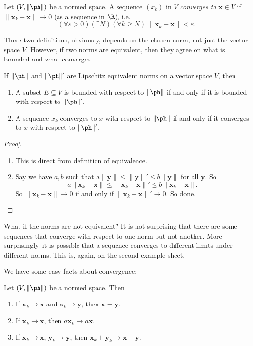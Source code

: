 \documentclass[a4paper]{article}
\begin{document}
\begin{defi}
  Let $(V, \|\ph\|)$ be a normed space. A sequence $(x_k)$ in $V$ \emph{converges to} $\mathbf{x} \in V$ if $\|\mathbf{x}_k - \mathbf{x}\| \to 0$ (as a sequence in $\R$), i.e.
  \[
    (\forall \varepsilon > 0)(\exists N)(\forall k \geq N)\; \|\mathbf{x}_k - \mathbf{x}\| < \varepsilon.
  \]
\end{defi}
These two definitions, obviously, depends on the chosen norm, not just the vector space $V$. However, if two norms are equivalent, then they agree on what is bounded and what converges.
\begin{prop}
  If $\|\ph \|$ and $\|\ph \|'$ are Lipschitz equivalent norms on a vector space $V$, then
  \begin{enumerate}
    \item A subset $E\subseteq V$ is bounded with respect to $\|\ph \|$ if and only if it is bounded with respect to $\|\ph \|'$.
    \item A sequence $x_k$ converges to $x$ with respect to $\|\ph \|$ if and only if it converges to $x$ with respect to $\|\ph \|'$.
  \end{enumerate}
\end{prop}

\begin{proof}\leavevmode
  \begin{enumerate}
    \item This is direct from definition of equivalence.
    \item Say we have $a, b$ such that $a\|\mathbf{y}\| \leq \|\mathbf{y}\|' \leq b\|\mathbf{y}\|$ for all $\mathbf{y}$. So
      \[
        a\|\mathbf{x}_k - \mathbf{x}\| \leq \|\mathbf{x}_k - \mathbf{x}\|' \leq b\|\mathbf{x}_k - \mathbf{x}\|.
      \]
      So $\|\mathbf{x}_k - \mathbf{x}\| \to 0$ if and only if $\|\mathbf{x}_k - \mathbf{x}\|' \to 0$. So done.
  \end{enumerate}
\end{proof}
What if the norms are not equivalent? It is not surprising that there are some sequences that converge with respect to one norm but not another. More surprisingly, it is possible that a sequence converges to different limits under different norms. This is, again, on the second example sheet.

We have some easy facts about convergence:
\begin{prop}
  Let $(V, \|\ph \|)$ be a normed space. Then
  \begin{enumerate}
    \item If $\mathbf{x}_k \to \mathbf{x}$ and $\mathbf{x}_k \to \mathbf{y}$, then $\mathbf{x} = \mathbf{y}$.
    \item If $\mathbf{x}_k \to \mathbf{x}$, then $a\mathbf{x}_k \to a\mathbf{x}$.
    \item If $\mathbf{x}_k \to \mathbf{x}$, $\mathbf{y}_k \to \mathbf{y}$, then $\mathbf{x}_k + \mathbf{y}_k \to \mathbf{x} + \mathbf{y}$.
  \end{enumerate}
\end{prop}
\end{document}
